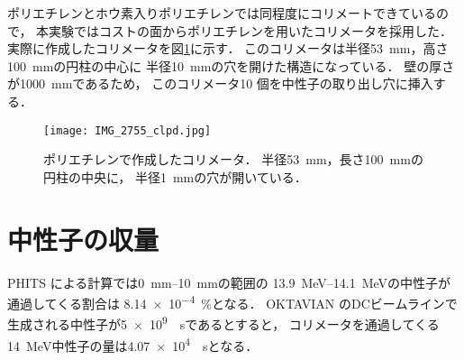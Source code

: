 \documentclass[../master]{subfiles}
\begin{document}
ポリエチレンとホウ素入りポリエチレンでは同程度にコリメートできているので，
本実験ではコストの面からポリエチレンを用いたコリメータを採用した．
実際に作成したコリメータを図\ref{pic::collimator}に示す．
このコリメータは半径\SI{53}{\milli\metre}，高さ\SI{100}{\milli\metre}の円柱の中心に
半径\SI{10}{\milli\metre}の穴を開けた構造になっている．
壁の厚さが\SI{1000}{\milli\metre}であるため，
このコリメータ10 個を中性子の取り出し穴に挿入する．
\begin{figure}
  \centering
  \texttt{[image: IMG\_2755\_clpd.jpg]}
  \caption[ポリエチレンで作成したコリメータ．]
          {ポリエチレンで作成したコリメータ．
            半径\SI{53}{\milli\metre}，長さ\SI{100}{\milli\metre}の円柱の中央に，
          半径\SI{1}{\milli\metre}の穴が開いている．}
  \label{pic::collimator}
\end{figure}

\section{中性子の収量}
PHITS による計算では\SIrange{0}{10}{\milli\metre}の範囲の
\SIrange{13.9}{14.1}{\mega\electronvolt}の中性子が通過してくる割合は
\SI{8.14e-4}{\percent}となる．
OKTAVIAN のDCビームラインで生成される中性子が\SI{5e9}{\per\second}であるとすると，
コリメータを通過してくる\SI{14}{\mega\electronvolt}中性子の量は\SI{4.07e4}{\per\second}となる．
\end{document}
